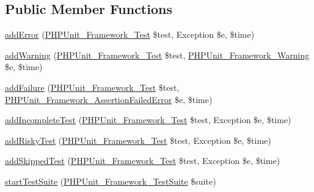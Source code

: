 \subsection*{Public Member Functions}
\begin{DoxyCompactItemize}
\item 
\mbox{\hyperlink{class_p_h_p_unit___framework___base_test_listener_a320d7bc7d2f9264ee7ba7aca6fd2df41}{add\+Error}} (\mbox{\hyperlink{interface_p_h_p_unit___framework___test}{P\+H\+P\+Unit\+\_\+\+Framework\+\_\+\+Test}} \$test, Exception \$e, \$time)
\item 
\mbox{\hyperlink{class_p_h_p_unit___framework___base_test_listener_a6c3d134992c5b03573561ef82e7f743d}{add\+Warning}} (\mbox{\hyperlink{interface_p_h_p_unit___framework___test}{P\+H\+P\+Unit\+\_\+\+Framework\+\_\+\+Test}} \$test, \mbox{\hyperlink{class_p_h_p_unit___framework___warning}{P\+H\+P\+Unit\+\_\+\+Framework\+\_\+\+Warning}} \$e, \$time)
\item 
\mbox{\hyperlink{class_p_h_p_unit___framework___base_test_listener_a668f17b68705c5c8686bac690a6f719d}{add\+Failure}} (\mbox{\hyperlink{interface_p_h_p_unit___framework___test}{P\+H\+P\+Unit\+\_\+\+Framework\+\_\+\+Test}} \$test, \mbox{\hyperlink{class_p_h_p_unit___framework___assertion_failed_error}{P\+H\+P\+Unit\+\_\+\+Framework\+\_\+\+Assertion\+Failed\+Error}} \$e, \$time)
\item 
\mbox{\hyperlink{class_p_h_p_unit___framework___base_test_listener_a81bfe09a62194fe5769ca1cc36ee428b}{add\+Incomplete\+Test}} (\mbox{\hyperlink{interface_p_h_p_unit___framework___test}{P\+H\+P\+Unit\+\_\+\+Framework\+\_\+\+Test}} \$test, Exception \$e, \$time)
\item 
\mbox{\hyperlink{class_p_h_p_unit___framework___base_test_listener_ad161e7d13b117cb0af3967cd2adc6bba}{add\+Risky\+Test}} (\mbox{\hyperlink{interface_p_h_p_unit___framework___test}{P\+H\+P\+Unit\+\_\+\+Framework\+\_\+\+Test}} \$test, Exception \$e, \$time)
\item 
\mbox{\hyperlink{class_p_h_p_unit___framework___base_test_listener_a1c0cb3bc58e5807530daf3a93783ed4e}{add\+Skipped\+Test}} (\mbox{\hyperlink{interface_p_h_p_unit___framework___test}{P\+H\+P\+Unit\+\_\+\+Framework\+\_\+\+Test}} \$test, Exception \$e, \$time)
\item 
\mbox{\hyperlink{class_p_h_p_unit___framework___base_test_listener_a901a86a623d83184267b21f2daee0ff5}{start\+Test\+Suite}} (\mbox{\hyperlink{class_p_h_p_unit___framework___test_suite}{P\+H\+P\+Unit\+\_\+\+Framework\+\_\+\+Test\+Suite}} \$suite)
\item 

\end{DoxyCompactItemize}
